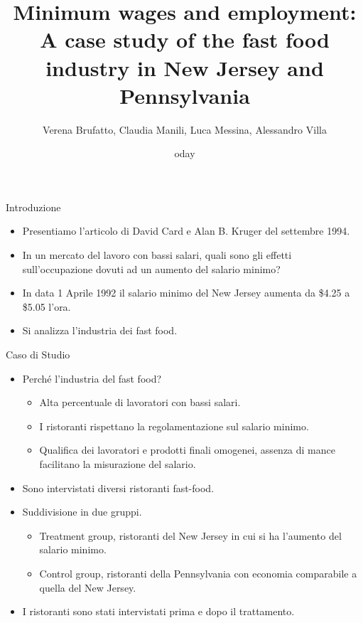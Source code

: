 \documentclass[
  ignorenonframetext,
]{beamer}
\title{Minimum wages and employment: A case study of the fast food industry in
New Jersey and Pennsylvania}
\author{Verena Brufatto, Claudia Manili, Luca Messina, Alessandro Villa}
\date{oday}
\providecommand{\tightlist}{%
  \setlength{\itemsep}{0pt}\setlength{\parskip}{0pt}}
\begin{document}
\frame{\titlepage}

\begin{frame}{Introduzione}
\protect\hypertarget{introduzione}{}

\begin{itemize}
\tightlist
\item
  Presentiamo l'articolo di David Card e Alan B. Kruger del settembre
  1994.
\item
  In un mercato del lavoro con bassi salari, quali sono gli effetti
  sull'occupazione dovuti ad un aumento del salario minimo?
\item
  In data 1 Aprile 1992 il salario minimo del New Jersey aumenta da
  \$4.25 a \$5.05 l'ora.
\item
  Si analizza l'industria dei fast food.
\end{itemize}

\end{frame}

\begin{frame}{Caso di Studio}
\protect\hypertarget{caso-di-studio}{}

\begin{itemize}
\tightlist
\item
  Perché l'industria del fast food?

  \begin{itemize}
  \tightlist
  \item
    Alta percentuale di lavoratori con bassi salari.
  \item
    I ristoranti rispettano la regolamentazione sul salario minimo.
  \item
    Qualifica dei lavoratori e prodotti finali omogenei, assenza di
    mance facilitano la misurazione del salario.
  \end{itemize}
\item
  Sono intervistati diversi ristoranti fast-food.
\item
  Suddivisione in due gruppi.

  \begin{itemize}
  \tightlist
  \item
    Treatment group, ristoranti del New Jersey in cui si ha l'aumento
    del salario minimo.
  \item
    Control group, ristoranti della Pennsylvania con economia
    comparabile a quella del New Jersey.
  \end{itemize}
\item
  I ristoranti sono stati intervistati prima e dopo il trattamento.
\end{itemize}

\end{frame}
\end{document}
